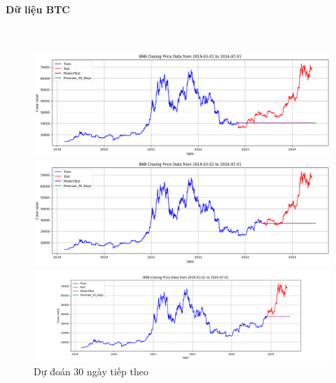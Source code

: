 \documentclass[conference]{IEEEtran}
\begin{document}
\paragraph{\textbf{Dữ liệu BTC}} \mbox{} \\
\begin{figure}[H]
    \centering
    \begin{minipage}{0.15\textwidth}
    \centering
    \includegraphics[width=1\textwidth]{Figure/ARIMA_BTC_30days_73.png}
    \end{minipage}
    \hfill
    \begin{minipage}{0.15\textwidth}
    \centering
    \includegraphics[width=1\textwidth]{Figure/ARIMA_BTC_30days_82.png}
    \end{minipage}
    \hfill
    \begin{minipage}{0.15\textwidth}
    \centering
    \includegraphics[width=1\textwidth]{Figure/ARIMA_BTC_30days_91.png}
    \end{minipage}
    \caption{Dự đoán 30 ngày tiếp theo}
    \label{fig:1}
\end{figure}
\end{document}

